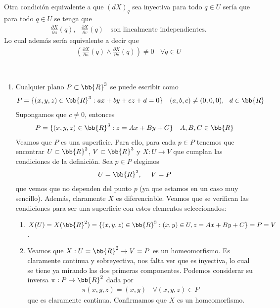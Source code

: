 \begin{observacion}
    Otra condición equivalente a que $(dX)_q$ sea inyectiva para todo $q\in U$ sería que para todo $q\in U$ se tenga que
    \begin{gather*}
        \frac{\partial X}{\partial u}(q),\ \ \ \frac{\partial X}{\partial v}(q)\ \ \ \text{ son linealmente independientes}.
    \end{gather*}
    Lo cual además sería equivalente a decir que 
    \begin{gather*}
        \left(\frac{\partial X}{\partial u}(q) \wedge \frac{\partial X}{\partial v}(q)\right) \neq 0\ \ \ \ \forall q\in U
    \end{gather*}
\end{observacion}

\begin{ejemplo}\
    \begin{enumerate}
        \item Cualquier plano $P\subset \bb{R}^3$ se puede escribir como
        \begin{gather*}
            P = \{(x,y,z)\in \bb{R}^3 : ax+by+cz+d=0\}\ \ \ (a,b,c)\neq (0,0,0),\ \ d\in \bb{R}
        \end{gather*}
        Supongamos que $c\neq 0$, entonces 
        \begin{gather*}
            P=\{(x,y,z)\in \bb{R}^3 : z=Ax+By+C\}\ \ \ A,B,C \in \bb{R}
        \end{gather*}
        Veamos que $P$ es una superficie. Para ello, para cada $p\in P$ tenemos que encontrar $U\subset \bb{R}^2$, $V\subset \bb{R}^3$ y $X:U\to V$ que cumplan las condiciones de la definición. Sea $p\in P$ elegimos
        \begin{gather*}
            U=\bb{R}^2, \ \ \ \ V=P
        \end{gather*}
        que vemos que no dependen del punto $p$ (ya que estamos en un caso muy sencillo). Además, claramente $X$ es diferenciable. Veamos que se verifican las condiciones para ser una superficie con estos elementos seleccionados:
        \begin{enumerate}
            \item $X(U)=X(\bb{R}^2) = \{(x,y,z)\in \bb{R}^3 : (x,y)\in U, z=Ax+By+C\} = P = V$.
            
            \item Veamos que $X: U=\bb{R}^2 \to V=P$ es un homeomorfismo. Es claramente continua y sobreyectiva, nos falta ver que es inyectiva, lo cual se tiene ya mirando las dos primeras componentes. Podemos considerar su inversa $\pi: P \to \bb{R}^2$ dada por 
            \begin{gather*}
                \pi(x,y,z) = (x,y) \ \ \ \ \forall (x,y,z)\in P
            \end{gather*}
            que es claramente continua. Confirmamos que $X$ es un homeomorfismo.


\end{enumerate}
\end{enumerate}
\end{ejemplo}
